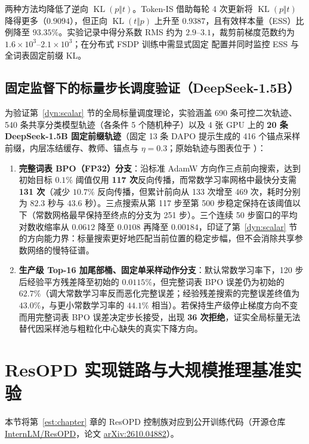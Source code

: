\documentclass[lang=cn,scheme=chinese,openany]{elegantbook}
\newcommand{\KL}{\operatorname{KL}}
\begin{document}
两种方法均降低了逆向 $\KL(p\Vert t)$。Token-IS 借助每轮 4 次更新将 $\KL(p\Vert t)$ 降得更多（$0.9094$），但正向 $\KL(t\Vert p)$ 上升至 $0.9387$，且有效样本量（ESS）比例降至 $93.35\%$。实验记录中得分系数 RMS 约为 $2.9$--$3.1$，裁剪前梯度范数约为 $1.6\times 10^3$--$2.1\times 10^3$；在分布式 FSDP 训练中需显式固定  配置并同时监控 ESS 与全词表固定前缀 KL。

\subsection{固定监督下的标量步长调度验证（DeepSeek-1.5B）}

为验证第~\ref{dyn:scalar} 节的全局标量调度理论，实验涵盖 690 条可控二次轨迹、540 条共享分类模型轨迹（各条件 5 个随机种子）以及 4 张 GPU 上的 \textbf{20 条 DeepSeek-1.5B 固定前缀轨迹}（固定 13 条 DAPO 提示生成的 416 个锚点采样前缀，内层冻结缓存、教师、锚点与 $\eta=0.3$；原始轨迹与图表位于 ）：
\begin{enumerate}
\item \textbf{完整词表 BPO（FP32）分支}：沿标准 AdamW 方向作三点前向搜索，达到初始目标 $0.1\%$ 阈值仅用 \textbf{117 次}反向传播，而常数学习率网格中最快分支需 \textbf{131 次}（减少 $10.7\%$ 反向传播，但累计前向从 133 次增至 469 次，耗时分别为 $82.3$ 秒与 $43.6$ 秒）。三点搜索从第 117 步至第 500 步稳定保持在该阈值以下（常数网格最早保持至终点的分支为 251 步）。三个连续 50 步窗口的平均对数收缩率从 $0.0612$ 降至 $0.0108$ 再降至 $0.00184$，印证了第~\ref{dyn:scalar} 节的方向能力界：标量搜索更好地匹配当前位置的稳定步幅，但不会消除共享参数网络的慢特征谱。
\item \textbf{生产级 Top-16 加尾部桶、固定单采样动作分支}：默认常数学习率下，120 步后经验平方残差降至初始的 $0.0115\%$，但完整词表 BPO 误差仍为初始的 $62.7\%$（调大常数学习率反而恶化完整误差；经验残差搜索的完整误差终值为 $43.0\%$，与更小常数学习率的 $44.1\%$ 相当）。若保持生产级停止梯度方向不变而用完整词表 BPO 误差决定步长接受，出现 \textbf{36 次拒绝}，证实全局标量无法替代因采样池与粗粒化中心缺失的真实下降方向。
\end{enumerate}

\section{ResOPD 实现链路与大规模推理基准实验}
\label{sec:resopd-implementation}

本节将第~\ref{est:chapter} 章的 ResOPD 控制族对应到公开训练代码（开源仓库 \href{https://github.com/InternLM/ResOPD}{InternLM/ResOPD}，论文 \href{https://arxiv.org/abs/2610.04882}{arXiv:2610.04882}）。
\end{document}
